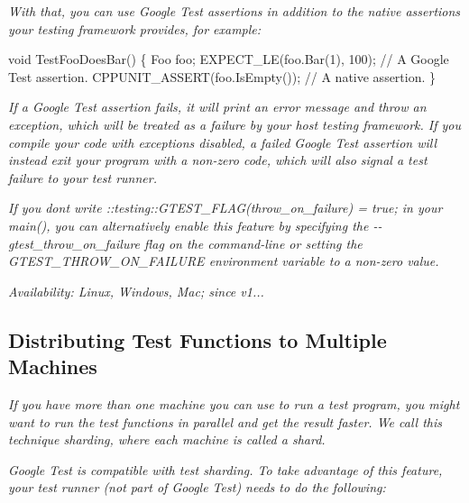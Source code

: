 {\itshape With that, you can use Google Test assertions in addition to the native assertions your testing framework provides, for example\+:}

{\itshape 
\begin{DoxyCode}
void TestFooDoesBar() \{
  Foo foo;
  EXPECT\_LE(foo.Bar(1), 100);     // A Google Test assertion.
  CPPUNIT\_ASSERT(foo.IsEmpty());  // A native assertion.
\}
\end{DoxyCode}
}

{\itshape If a Google Test assertion fails, it will print an error message and throw an exception, which will be treated as a failure by your host testing framework. If you compile your code with exceptions disabled, a failed Google Test assertion will instead exit your program with a non-\/zero code, which will also signal a test failure to your test runner.}

{\itshape If you don\textquotesingle{}t write {\ttfamily \+::testing\+::\+G\+T\+E\+S\+T\+\_\+\+F\+L\+A\+G(throw\+\_\+on\+\_\+failure) = true;} in your {\ttfamily main()}, you can alternatively enable this feature by specifying the {\ttfamily -\/-\/gtest\+\_\+throw\+\_\+on\+\_\+failure} flag on the command-\/line or setting the {\ttfamily G\+T\+E\+S\+T\+\_\+\+T\+H\+R\+O\+W\+\_\+\+O\+N\+\_\+\+F\+A\+I\+L\+U\+RE} environment variable to a non-\/zero value.}

{\itshape {\itshape Availability\+:} Linux, Windows, Mac; since v1...}

{\itshape \subsection*{Distributing Test Functions to Multiple Machines}}

{\itshape }

{\itshape If you have more than one machine you can use to run a test program, you might want to run the test functions in parallel and get the result faster. We call this technique {\itshape sharding}, where each machine is called a {\itshape shard}.}

{\itshape Google Test is compatible with test sharding. To take advantage of this feature, your test runner (not part of Google Test) needs to do the following\+:}

